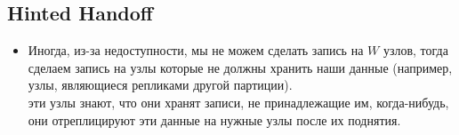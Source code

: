   \subsection{Hinted Handoff}
  \begin{itemize}
    \item Иногда, из-за недоступности, мы не можем сделать запись на $W$ узлов, тогда сделаем запись на узлы которые не должны хранить наши данные (например, узлы, являющиеся репликами другой партиции). \\
    эти узлы знают, что они хранят записи, не принадлежащие им, когда-нибудь, они отреплицируют эти данные на нужные узлы после их поднятия.
  \end{itemize}
